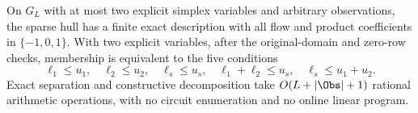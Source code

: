 \begin{theorem}\label{thm:two-state-chain}
On $G_L$ with at most two explicit simplex variables and arbitrary
observations, the sparse hull has a finite exact description with
all flow and product coefficients in $\{-1,0,1\}$.
With two explicit variables, after the original-domain and zero-row
checks, membership is equivalent to the five conditions
\begin{equation}\label{eq:chain-five-tests}
 \ell_1\le u_1,\quad \ell_2\le u_2,\quad
 \ell_s\le u_s,\quad
 \ell_1+\ell_2\le u_s,\quad
 \ell_s\le u_1+u_2.
\end{equation}
Exact separation and constructive decomposition take
$O(L+|\Obs|+1)$ rational arithmetic operations, with no circuit
enumeration and no online linear program.
\end{theorem}
